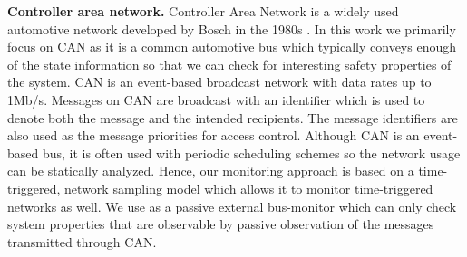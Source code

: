 

\vspace*{3pt}
\noindent
\textbf{Controller area network.} Controller Area Network is a
widely used automotive network developed by Bosch
in the 1980s \cite{Bosch1991}. In this work we  primarily focus on CAN as
it is a common automotive bus which typically conveys enough of the state
information so that we can check for interesting safety properties of the system.
CAN is an event-based broadcast network with data rates up to 1Mb/s.
Messages on CAN are broadcast with an identifier which is used to denote
both the message and the intended recipients.
The message identifiers are also used as the message priorities for access control.
Although CAN is an event-based bus,
it is often used with periodic scheduling schemes so the network usage can be statically
analyzed. Hence, our monitoring approach is based on a time-triggered, network sampling
model which allows it to monitor time-triggered networks as well.
We use \monitor as a passive external bus-monitor which can only check system properties that are observable by passive observation of the messages transmitted through CAN.




